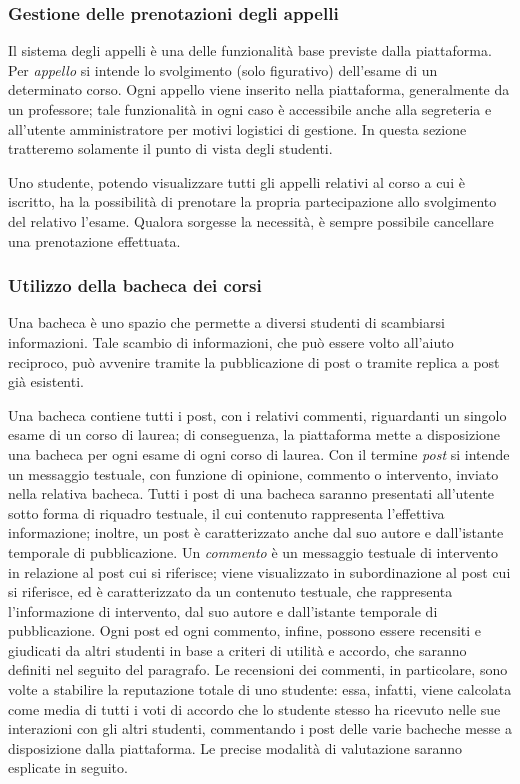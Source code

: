 \documentclass [a4paper,11pt]{book}
\begin{document}
\medskip

\subsubsection{Gestione delle prenotazioni degli appelli}

Il sistema degli appelli è una delle funzionalità base previste dalla piattaforma. Per \emph{appello} si intende lo svolgimento (solo figurativo) dell'esame di un determinato corso. Ogni appello viene inserito nella piattaforma, generalmente da un professore; tale funzionalità in ogni caso è accessibile anche alla segreteria e all'utente amministratore per motivi logistici di gestione. In questa sezione tratteremo solamente il punto di vista degli studenti.

Uno studente, potendo visualizzare tutti gli appelli relativi al corso a cui è iscritto, ha la possibilità di prenotare la propria partecipazione allo svolgimento del relativo l'esame. Qualora sorgesse la necessità, è sempre possibile cancellare una prenotazione effettuata.

\medskip

\subsubsection{Utilizzo della bacheca dei corsi}

\label{sec:bacheca}

Una bacheca è uno spazio che permette a diversi studenti di scambiarsi informazioni. Tale scambio di informazioni, che può essere volto all'aiuto reciproco, può avvenire tramite la pubblicazione di post o tramite replica a post già esistenti.

Una bacheca contiene tutti i post, con i relativi commenti, riguardanti un singolo esame di un corso di laurea; di conseguenza, la piattaforma mette a disposizione una bacheca per ogni esame di ogni corso di laurea. Con il termine \emph{post} si intende un messaggio testuale, con funzione di opinione, commento o intervento, inviato nella relativa bacheca. Tutti i post di una bacheca saranno presentati all'utente sotto forma di riquadro testuale, il cui contenuto rappresenta l'effettiva informazione; inoltre, un post è caratterizzato anche dal suo autore e dall'istante temporale di pubblicazione. Un \emph{commento} è un messaggio testuale di intervento in relazione al post cui si riferisce; viene visualizzato in subordinazione al post cui si riferisce, ed è caratterizzato da un contenuto testuale, che rappresenta l'informazione di intervento, dal suo autore e dall'istante temporale di pubblicazione. Ogni post ed ogni commento, infine, possono essere recensiti e giudicati da altri studenti in base a criteri di utilità e accordo, che saranno definiti nel seguito del paragrafo. Le recensioni dei commenti, in particolare, sono volte a stabilire la reputazione totale di uno studente: essa, infatti, viene calcolata come media di tutti i voti di accordo che lo studente stesso ha ricevuto nelle sue interazioni con gli altri studenti, commentando i post delle varie bacheche messe a disposizione dalla piattaforma. Le precise modalità di valutazione saranno esplicate in seguito.
\end{document}
